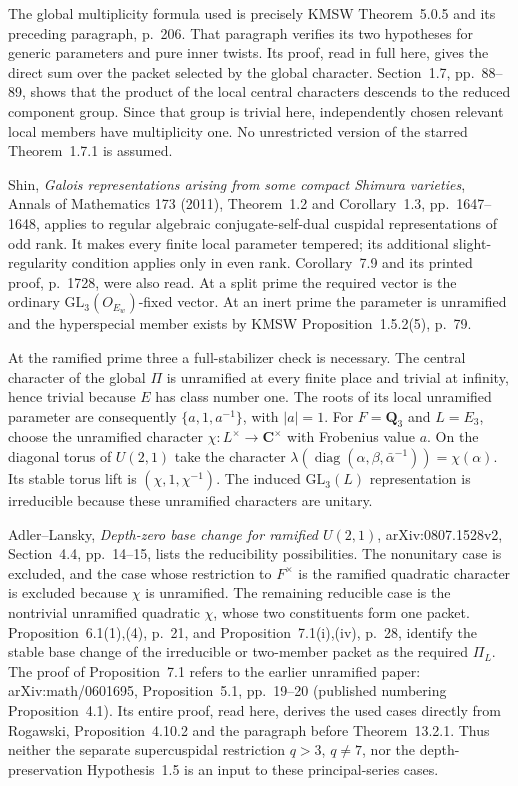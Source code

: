 The global multiplicity formula used is precisely KMSW
Theorem~5.0.5 and its preceding paragraph, p.~206.
That paragraph verifies its two hypotheses for generic parameters
and pure inner twists. Its proof, read in full here, gives the
direct sum over the packet selected by the global character.
Section~1.7, pp.~88--89, shows that the product of the local central
characters descends to the reduced component group. Since that
group is trivial here, independently chosen relevant local members
have multiplicity one.
No unrestricted version of the starred Theorem~1.7.1 is assumed.

Shin, \emph{Galois representations arising from some compact Shimura
varieties}, Annals of Mathematics 173 (2011), Theorem~1.2 and
Corollary~1.3, pp.~1647--1648, applies to regular algebraic
conjugate-self-dual cuspidal representations of odd rank.
It makes every finite local parameter tempered; its additional
slight-regularity condition applies only in even rank.
Corollary~7.9 and its printed proof, p.~1728, were also read.
At a split prime the required vector is the ordinary
$\mathrm{GL}_3(O_{E_w})$-fixed vector.
At an inert prime the parameter is unramified and the hyperspecial
member exists by KMSW Proposition~1.5.2(5), p.~79.

At the ramified prime three a full-stabilizer check is necessary.
The central character of the global $\Pi$ is unramified at every
finite place and trivial at infinity, hence trivial because $E$
has class number one. The roots of its local unramified parameter
are consequently $\{a,1,a^{-1}\}$, with $|a|=1$.
For $F=\mathbf Q_3$ and $L=E_3$, choose the unramified character
$\chi:L^\times\to\mathbf C^\times$ with Frobenius value $a$.
On the diagonal torus of $U(2,1)$ take the character
$\lambda(\operatorname{diag}(\alpha,\beta,\bar\alpha^{-1}))
=\chi(\alpha)$.
Its stable torus lift is $(\chi,1,\chi^{-1})$.
The induced $\mathrm{GL}_3(L)$ representation is irreducible
because these unramified characters are unitary.

Adler--Lansky, \emph{Depth-zero base change for ramified $U(2,1)$},
arXiv:0807.1528v2, Section~4.4, pp.~14--15, lists the reducibility
possibilities. The nonunitary case is excluded, and the case whose
restriction to $F^\times$ is the ramified quadratic character is
excluded because $\chi$ is unramified. The remaining reducible
case is the nontrivial unramified quadratic $\chi$, whose two
constituents form one packet.
Proposition~6.1(1),(4), p.~21, and Proposition~7.1(i),(iv), p.~28,
identify the stable base change of the irreducible or two-member
packet as the required $\Pi_L$.
The proof of Proposition~7.1 refers to the earlier unramified paper:
arXiv:math/0601695, Proposition~5.1, pp.~19--20 (published
numbering Proposition~4.1). Its entire proof, read here, derives
the used cases directly from Rogawski, Proposition~4.10.2 and
the paragraph before Theorem~13.2.1.
Thus neither the separate supercuspidal restriction
$q>3$, $q\ne7$, nor the depth-preservation Hypothesis~1.5 is an
input to these principal-series cases.

